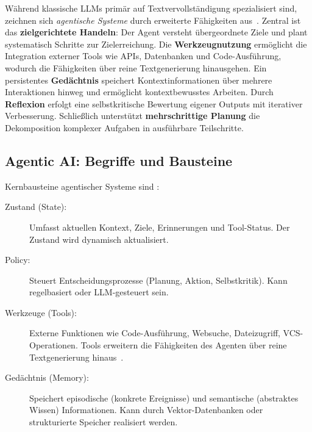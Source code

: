 Während klassische LLMs primär auf Textvervollständigung spezialisiert sind, zeichnen sich \emph{agentische Systeme} durch erweiterte Fähigkeiten aus~\cite{wang2023survey}. Zentral ist das \textbf{zielgerichtete Handeln}: Der Agent versteht übergeordnete Ziele und plant systematisch Schritte zur Zielerreichung. Die \textbf{Werkzeugnutzung} ermöglicht die Integration externer Tools wie APIs, Datenbanken und Code-Ausführung, wodurch die Fähigkeiten über reine Textgenerierung hinausgehen. Ein persistentes \textbf{Gedächtnis} speichert Kontextinformationen über mehrere Interaktionen hinweg und ermöglicht kontextbewusstes Arbeiten. Durch \textbf{Reflexion} erfolgt eine selbstkritische Bewertung eigener Outputs mit iterativer Verbesserung. Schließlich unterstützt \textbf{mehrschrittige Planung} die Dekomposition komplexer Aufgaben in ausführbare Teilschritte.

\subsection{Agentic AI: Begriffe und Bausteine}

Kernbausteine agentischer Systeme sind \cite{weng2023prompt,yao2023react}:

\begin{description}
  \item[Zustand (State):] Umfasst aktuellen Kontext, Ziele, Erinnerungen und Tool-Status. Der Zustand wird dynamisch aktualisiert.
  
  \item[Policy:] Steuert Entscheidungsprozesse (Planung, Aktion, Selbstkritik). Kann regelbasiert oder LLM-gesteuert sein.
  
  \item[Werkzeuge (Tools):] Externe Funktionen wie Code-Ausführung, Websuche, Dateizugriff, VCS-Operationen. Tools erweitern die Fähigkeiten des Agenten über reine Textgenerierung hinaus~\cite{schick2023toolformer,qin2023tool}.
  
  \item[Gedächtnis (Memory):] Speichert episodische (konkrete Ereignisse) und semantische (abstraktes Wissen) Informationen. Kann durch Vektor-Datenbanken oder strukturierte Speicher realisiert werden.
\end{description}

